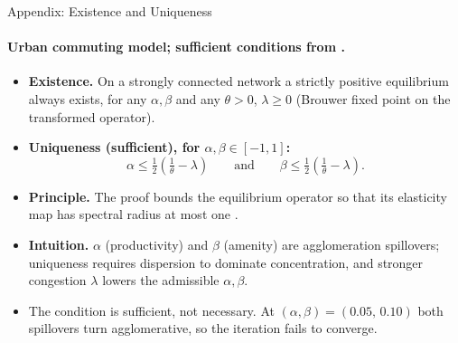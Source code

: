 \documentclass[11pt,aspectratio=169]{beamer}
\newcommand{\navback}[1]{\par\vspace{0.35em}\noindent\hfill\hyperlink{#1}{\beamerreturnbutton{back}}}
\begin{document}
\begin{frame}[label=appexist]{Appendix: Existence and Uniqueness}
\framesubtitle{Urban commuting model; sufficient conditions from \citet[Proposition~1]{allenarkolakis2022}.}
\small
\begin{itemize}
  \item \textbf{Existence.} On a strongly connected network a strictly positive equilibrium always exists, for any $\alpha,\beta$ and any $\theta>0$, $\lambda\ge0$ (Brouwer fixed point on the transformed operator).
  \item \textbf{Uniqueness (sufficient), for $\alpha,\beta\in[-1,1]$:}
  \vspace{-0.15em}\[
    \alpha\le\tfrac12\!\left(\tfrac1\theta-\lambda\right)
    \qquad\text{and}\qquad
    \beta\le\tfrac12\!\left(\tfrac1\theta-\lambda\right).
  \]
  \item \textbf{Principle.} The proof bounds the equilibrium operator so that its elasticity map has spectral radius at most one \citep{allenarkolakisli2020,karlin1967}.
  \item \textbf{Intuition.} $\alpha$ (productivity) and $\beta$ (amenity) are agglomeration spillovers; uniqueness requires dispersion to dominate concentration, and stronger congestion $\lambda$ lowers the admissible $\alpha,\beta$.
  \item The condition is sufficient, not necessary. At $(\alpha,\beta)=(0.05,\,0.10)$ both spillovers turn agglomerative, so the iteration fails to converge.
\end{itemize}
\navback{equilibrium}
\end{frame}

\end{document}
